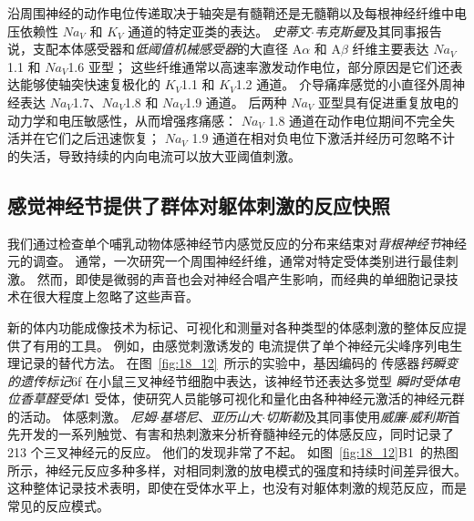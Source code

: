 沿周围神经的动作电位传递取决于轴突是有髓鞘还是无髓鞘以及每根神经纤维中电压依赖性 $Na_V$ 和 $K_V$ 通道的特定亚类的表达。
\textit{史蒂文$\cdot$韦克斯曼}及其同事报告说，支配本体感受器和\textit{低阈值机械感受器}的大直径 A$\alpha$ 和 A$\beta$ 纤维主要表达 $Na_V$1.1 和 $Na_V$1.6 亚型；
这些纤维通常以高速率激发动作电位，部分原因是它们还表达能够使轴突快速复极化的 $K_V$1.1 和 $K_V$1.2 通道。
介导痛痒感觉的小直径外周神经表达 $Na_V$1.7、$Na_V$1.8 和 $Na_V$1.9 通道。
后两种 $Na_V$ 亚型具有促进重复放电的动力学和电压敏感性，从而增强疼痛感：
$Na_V$ 1.8 通道在动作电位期间不完全失活并在它们之后迅速恢复； 
$Na_V$ 1.9 通道在相对负电位下激活并经历可忽略不计的失活，导致持续的内向电流可以放大亚阈值刺激。



\subsection{感觉神经节提供了群体对躯体刺激的反应快照}

我们通过检查单个哺乳动物体感神经节内感觉反应的分布来结束对\textit{背根神经节}神经元的调查。
通常，一次研究一个周围神经纤维，通常对特定受体类别进行最佳刺激。
然而，即使是微弱的声音也会对神经合唱产生影响，而经典的单细胞记录技术在很大程度上忽略了这些声音。


新的体内功能成像技术为标记、可视化和测量对各种类型的体感刺激的整体反应提供了有用的工具。
例如，由感觉刺激诱发的  电流提供了单个神经元尖峰序列电生理记录的替代方法。
在图~\ref{fig:18_12}~所示的实验中，基因编码的  传感器\textit{钙瞬变的遗传标记}6f 在小鼠三叉神经节细胞中表达，该神经节还表达多觉型 \textit{瞬时受体电位香草醛受体}1 受体，使研究人员能够可视化和量化由各种神经元激活的神经元群的活动。 体感刺激。
\textit{尼姆$\cdot$基塔尼}、\textit{亚历山大$\cdot$切斯勒}及其同事使用\textit{威廉$\cdot$威利斯}首先开发的一系列触觉、有害和热刺激来分析脊髓神经元的体感反应，同时记录了 213 个三叉神经元的反应。
他们的发现非常了不起。
如图~\ref{fig:18_12}B1~的热图所示，神经元反应多种多样，对相同刺激的放电模式的强度和持续时间差异很大。 
这种整体记录技术表明，即使在受体水平上，也没有对躯体刺激的规范反应，而是常见的反应模式。

